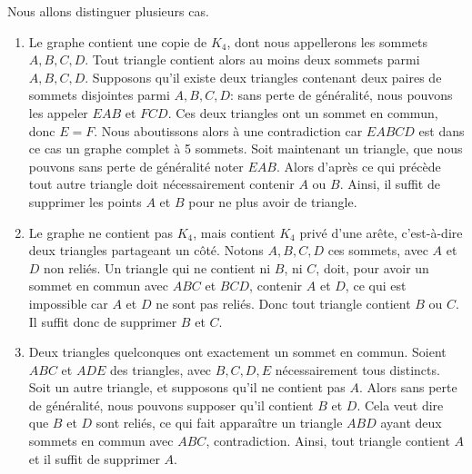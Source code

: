 \begin{sol} Nous allons distinguer plusieurs cas.\begin{enumerate} \item Le graphe contient une copie de $K_4$, dont nous appellerons les sommets $A,B,C,D$. Tout triangle contient alors au moins deux sommets parmi $A,B,C,D$. Supposons qu'il existe deux triangles contenant deux paires de sommets disjointes parmi $A,B,C,D$: sans perte de généralité, nous pouvons les appeler $EAB$ et $FCD$. Ces deux triangles ont un sommet en commun, donc $E=F$. Nous aboutissons alors à une contradiction car $EABCD$ est dans ce cas un graphe complet à 5 sommets. Soit maintenant un triangle, que nous pouvons sans perte de généralité noter $EAB$. Alors d'après ce qui précède tout autre triangle doit nécessairement contenir $A$ ou $B$. Ainsi, il suffit de supprimer les points $A$ et $B$ pour ne plus avoir de triangle. 
\item Le graphe ne contient pas $K_4$, mais contient $K_4$ privé d'une arête, c'est-à-dire deux triangles partageant un côté. Notons $A,B,C,D$ ces sommets, avec $A$ et $D$ non reliés. Un triangle qui ne contient ni $B$, ni $C$, doit, pour avoir un sommet en commun avec $ABC$ et $BCD$, contenir $A$ et $D$, ce qui est impossible car $A$ et $D$ ne sont pas reliés. Donc tout triangle contient $B$ ou $C$. Il suffit donc de supprimer $B$ et $C$.
\item Deux triangles quelconques ont exactement un sommet en commun. Soient $ABC$ et $ADE$ des triangles, avec $B,C,D,E$ nécessairement tous distincts. Soit un autre triangle, et supposons qu'il ne contient pas $A$. Alors sans perte de généralité, nous pouvons supposer qu'il contient $B$ et $D$. Cela veut dire que $B$ et $D$ sont reliés, ce qui fait apparaître un triangle $ABD$ ayant deux sommets en commun avec $ABC$, contradiction. Ainsi, tout triangle contient $A$ et il suffit de supprimer $A$. 
\end{enumerate}
\end{sol}

